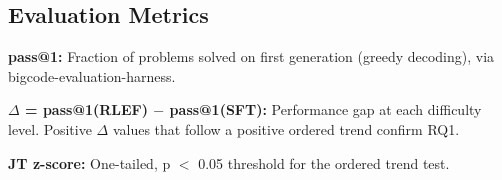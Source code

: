 \subsection{Evaluation Metrics}

\textbf{pass@1:} Fraction of problems solved on first generation (greedy decoding), via bigcode-evaluation-harness.

\textbf{$\Delta$ = pass@1(RLEF) $-$ pass@1(SFT):} Performance gap at each difficulty level. Positive $\Delta$ values that follow a positive ordered trend confirm RQ1.

\textbf{JT z-score:} One-tailed, p $<$ 0.05 threshold for the ordered trend test.
